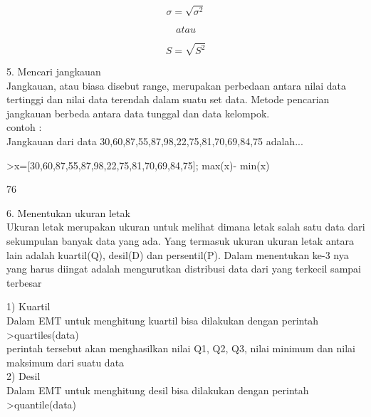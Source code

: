 \documentclass[a4paper,10pt]{article}
\begin{document}
\begin{eulernotebook}
\begin{eulercomment}
\begin{eulercomment}
\begin{eulercomment}
\begin{eulercomment}
\begin{eulercomment}
\begin{eulercomment}
\begin{eulercomment}
\end{eulercomment}
\begin{eulerformula}
\[
\sigma=\sqrt{\sigma^2}
\]
\end{eulerformula}
\begin{eulerformula}
\[
atau
\]
\end{eulerformula}
\begin{eulerformula}
\[
S=\sqrt{S^2}
\]
\end{eulerformula}
\begin{eulercomment}
5. Mencari jangkauan\\
Jangkauan, atau biasa disebut range, merupakan perbedaan antara nilai
data tertinggi dan nilai data terendah dalam suatu set data. Metode
pencarian jangkauan berbeda antara data tunggal dan data kelompok.\\
contoh :\\
Jangkauan dari data 30,60,87,55,87,98,22,75,81,70,69,84,75 adalah...
\end{eulercomment}
\begin{eulerprompt}
>x=[30,60,87,55,87,98,22,75,81,70,69,84,75]; max(x)- min(x)
\end{eulerprompt}
\begin{euleroutput}
  76
\end{euleroutput}
\begin{eulercomment}
6. Menentukan ukuran letak\\
Ukuran letak merupakan ukuran untuk melihat dimana letak salah satu
data dari sekumpulan banyak data yang ada. Yang termasuk ukuran ukuran
letak antara lain adalah kuartil(Q), desil(D) dan persentil(P). Dalam
menentukan ke-3 nya yang harus diingat adalah mengurutkan distribusi
data dari yang terkecil sampai terbesar

1) Kuartil\\
Dalam EMT untuk menghitung kuartil bisa dilakukan dengan perintah\\
\textgreater{}quartiles(data)\\
perintah tersebut akan menghasilkan nilai Q1, Q2, Q3, nilai minimum
dan nilai maksimum dari suatu data\\
2) Desil\\
Dalam EMT untuk menghitung desil bisa dilakukan dengan perintah\\
\textgreater{}quantile(data)


\end{eulercomment}
\end{eulercomment}
\end{eulercomment}
\end{eulercomment}
\end{eulercomment}
\end{eulercomment}
\end{eulercomment}
\end{eulernotebook}
\end{document}
